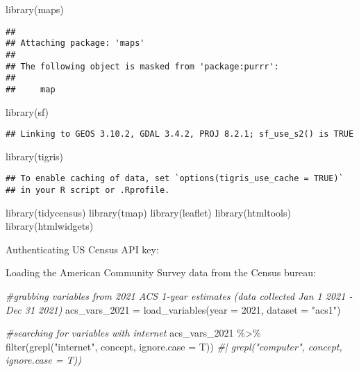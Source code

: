 \documentclass[
]{article}
\newenvironment{Shaded}{\begin{snugshade}}{\end{snugshade}}
\newcommand{\AttributeTok}[1]{\textcolor[rgb]{0.77,0.63,0.00}{#1}}
\newcommand{\CommentTok}[1]{\textcolor[rgb]{0.56,0.35,0.01}{\textit{#1}}}
\newcommand{\DecValTok}[1]{\textcolor[rgb]{0.00,0.00,0.81}{#1}}
\newcommand{\FunctionTok}[1]{\textcolor[rgb]{0.00,0.00,0.00}{#1}}
\newcommand{\NormalTok}[1]{#1}
\newcommand{\OtherTok}[1]{\textcolor[rgb]{0.56,0.35,0.01}{#1}}
\newcommand{\SpecialCharTok}[1]{\textcolor[rgb]{0.00,0.00,0.00}{#1}}
\newcommand{\StringTok}[1]{\textcolor[rgb]{0.31,0.60,0.02}{#1}}
\begin{document}
\begin{Shaded}
\begin{Highlighting}[]
\FunctionTok{library}\NormalTok{(maps)}
\end{Highlighting}
\end{Shaded}

\begin{verbatim}
## 
## Attaching package: 'maps'
## 
## The following object is masked from 'package:purrr':
## 
##     map
\end{verbatim}

\begin{Shaded}
\begin{Highlighting}[]
\FunctionTok{library}\NormalTok{(sf)}
\end{Highlighting}
\end{Shaded}

\begin{verbatim}
## Linking to GEOS 3.10.2, GDAL 3.4.2, PROJ 8.2.1; sf_use_s2() is TRUE
\end{verbatim}

\begin{Shaded}
\begin{Highlighting}[]
\FunctionTok{library}\NormalTok{(tigris)}
\end{Highlighting}
\end{Shaded}

\begin{verbatim}
## To enable caching of data, set `options(tigris_use_cache = TRUE)`
## in your R script or .Rprofile.
\end{verbatim}

\begin{Shaded}
\begin{Highlighting}[]
\FunctionTok{library}\NormalTok{(tidycensus)}
\FunctionTok{library}\NormalTok{(tmap)}
\FunctionTok{library}\NormalTok{(leaflet)}
\FunctionTok{library}\NormalTok{(htmltools)}
\FunctionTok{library}\NormalTok{(htmlwidgets)}
\end{Highlighting}
\end{Shaded}

Authenticating US Census API key:

Loading the American Community Survey data from the Census bureau:

\begin{Shaded}
\begin{Highlighting}[]
\CommentTok{\#grabbing variables from 2021 ACS 1{-}year estimates (data collected Jan 1 2021 {-} Dec 31 2021)}
\NormalTok{acs\_vars\_2021 }\OtherTok{=} \FunctionTok{load\_variables}\NormalTok{(}\AttributeTok{year =} \DecValTok{2021}\NormalTok{, }\AttributeTok{dataset =} \StringTok{"acs1"}\NormalTok{)}

\CommentTok{\#searching for variables with internet }
\NormalTok{acs\_vars\_2021 }\SpecialCharTok{\%\textgreater{}\%} \FunctionTok{filter}\NormalTok{(}\FunctionTok{grepl}\NormalTok{(}\StringTok{"internet"}\NormalTok{, concept, }\AttributeTok{ignore.case =}\NormalTok{ T)) }\CommentTok{\#| grepl("computer", concept, ignore.case = T))}
\end{Highlighting}
\end{Shaded}
\end{document}
